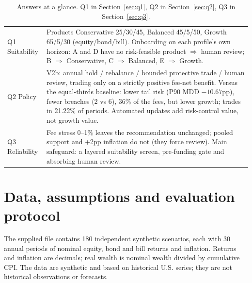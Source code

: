 \documentclass[11pt,a4paper]{article}
\begin{document}
\begin{table}[H]
\centering
\caption{Answers at a glance. Q1 in Section~\ref{sec:q1}, Q2 in
Section~\ref{sec:q2}, Q3 in Section~\ref{sec:q3}.}
\label{tab:glance}
\begin{tabular}{@{}>{\raggedright\arraybackslash}p{2.5cm}>{\raggedright\arraybackslash}p{12.6cm}@{}}
\toprule
Q1 Suitability & Products Conservative 25/30/45, Balanced 45/5/50, Growth
65/5/30 (equity/bond/bill). Onboarding on each profile's own horizon: A and D
have no risk-feasible product $\Rightarrow$ human review; B $\Rightarrow$
Conservative, C $\Rightarrow$ Balanced, E $\Rightarrow$ Growth. \\
\addlinespace
Q2 Policy & V2b: annual hold / rebalance / bounded protective trade / human
review, trading only on a strictly positive fee-net benefit. Versus the
equal-thirds baseline: lower tail risk (P90 MDD $-10.67$pp), fewer breaches
(2 vs 6), 36\% of the fees, but lower growth; trades in 21.22\% of periods.
Automated updates add risk-control value, not growth value. \\
\addlinespace
Q3 Reliability & Fee stress 0--1\% leaves the recommendation unchanged; pooled
support and +2pp inflation do not (they force review). Main safeguard: a
layered suitability screen, pre-funding gate and absorbing human review. \\
\bottomrule
\end{tabular}
\end{table}

\section{Data, assumptions and evaluation protocol}
\label{sec:data}

The supplied file contains 180 independent synthetic scenarios, each with 30
annual periods of nominal equity, bond and bill returns and inflation. Returns and
inflation are decimals; real wealth is nominal wealth divided by cumulative CPI.
The data are synthetic and based on historical U.S. series; they are not
historical observations or forecasts.
\end{document}
